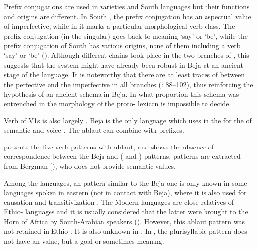 \documentclass[output=paper]{langsci/langscibook}
\begin{document}
Prefix conjugations are used in  varieties and South  languages but their functions and origins are different. In South , the prefix conjugation has an aspectual value of imperfective, while in  it marks a particular morphological verb class. The  prefix conjugation (in the singular) goes back to  meaning ‘say’ or ‘be’, while the prefix conjugation of South  has various origins, none of them including a verb ‘say’ or ‘be’ (\citealt{Cohen1984}). Although different  chains took place in the two branches of , this suggests that the  system might have already been robust in Beja at an ancient stage of the language. It is noteworthy that there are at least traces of  between the perfective and the imperfective in all  branches (\citealt{Cohen1984}: 88--102), thus reinforcing the hypothesis of an ancient  schema in Beja. In what proportion this schema was entrenched in the morphology of the proto- lexicon is impossible to decide.

Verb  of V1s is also largely . Beja is the only  language which uses  in the  for the  of semantic and voice . The ablaut can combine with prefixes. 

 presents the five verb  patterns with ablaut, and  shows the absence of correspondence between the Beja and  ( and ) patterns.  patterns are extracted from Bergman (\citeyear[32--34]{Bergman2002}), who does not provide semantic values.\largerpage[2]

Among the  languages, an  pattern similar to the Beja one is only known in some  languages spoken in eastern  (not in contact with Beja), where it is also used for causation and transitivization \citep[1091]{Simeone-Senelle2011}. The Modern  languages are close relatives of Ethio- languages and it is usually considered that the latter were brought to the Horn of Africa by South-Arabian speakers (\citealt{Ullendorf1955}). However, this ablaut pattern was not retained in Ethio-. It is also unknown in . In  , the plurisyllabic pattern does not have an  value, but a goal or sometimes  meaning.\newpage
\end{document}
